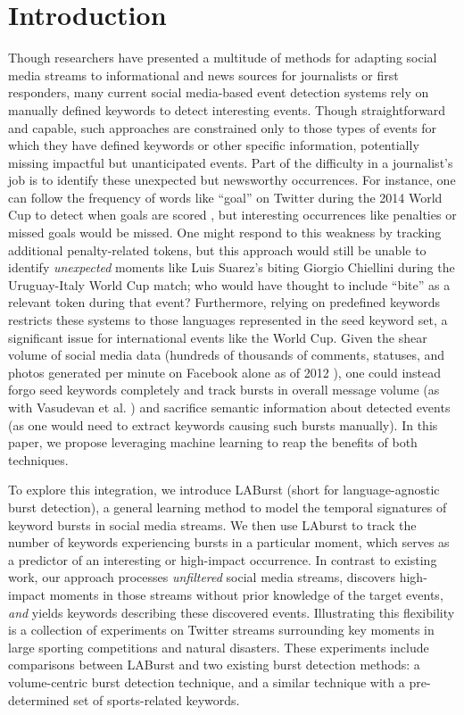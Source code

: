 \documentclass[letterpaper]{article}
\begin{document}
\section{Introduction}

Though researchers have presented a multitude of methods for adapting social media streams to informational and news sources for journalists or first responders, many current social media-based event detection systems rely on manually defined keywords to detect interesting events.
Though straightforward and capable, such approaches are constrained only to those types of events for which they have defined keywords or other specific information, potentially missing impactful but unanticipated events.
Part of the difficulty in a journalist's job is to identify these unexpected but newsworthy occurrences.
For instance, one can follow the frequency of words like ``goal'' on Twitter during the 2014 World Cup to detect when goals are scored \cite{Cipriani2014}, but interesting occurrences like penalties or missed goals would be missed.
One might respond to this weakness by tracking additional penalty-related tokens, but this approach would still be unable to identify \emph{unexpected} moments like Luis Suarez's biting Giorgio Chiellini during the Uruguay-Italy World Cup match; who would have thought to include ``bite'' as a relevant token during that event?
Furthermore, relying on predefined keywords restricts these systems to those languages represented in the seed keyword set, a significant issue for international events like the World Cup.
Given the shear volume of social media data (hundreds of thousands of comments, statuses, and photos generated per minute on Facebook alone as of 2012 \cite{Pring2012}), one could instead forgo seed keywords completely and track bursts in overall message volume (as with Vasudevan et al. \cite{vasudevan2013twitter}) and sacrifice semantic information about detected events (as one would need to extract keywords causing such bursts manually).
In this paper, we propose leveraging machine learning to reap the benefits of both techniques.

To explore this integration, we introduce LABurst (short for language-agnostic burst detection), a general learning method to model the temporal signatures of keyword bursts in social media streams.
We then use LAburst to track the number of keywords experiencing bursts in a particular moment, which serves as a predictor of an interesting or high-impact occurrence. 
In contrast to existing work, our approach processes \emph{unfiltered} social media streams, discovers high-impact moments in those streams without prior knowledge of the target events, \emph{and} yields keywords describing these discovered events.
Illustrating this flexibility is a collection of experiments on Twitter streams surrounding key moments in large sporting competitions and natural disasters.
These experiments include comparisons between LABurst and two existing burst detection methods: a volume-centric burst detection technique, and a similar technique with a pre-determined set of sports-related keywords.
\end{document}
